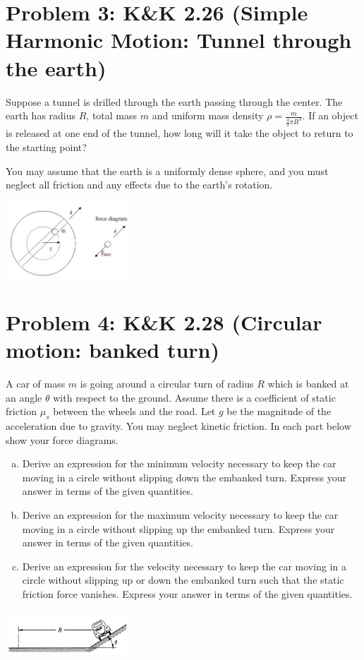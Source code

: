 \documentclass[problems]{esg8012pset}
\begin{document}
\section*{Problem 3: K\&K 2.26 (Simple Harmonic Motion: Tunnel through the earth)}
  Suppose a tunnel is drilled through the earth passing through the center. The earth has radius $R$, total mass $m$ and uniform mass density $\rho = \frac{m}{\frac{4}{3}\pi R^3}$.  If an object is released at one end of the tunnel, how long will it take the object to return to the starting point?

  You may assume that the earth is a uniformly dense sphere, and you must neglect all friction and any effects due to the earth's rotation.
  \begin{center}\includegraphics[width=0.35\textwidth]{ps03_2}\end{center}
\section*{Problem 4: K\&K 2.28 (Circular motion: banked turn)}
  A car of mass $m$ is going around a circular turn of radius $R$ which is banked at an angle $\theta$ with respect to the ground. Assume there is a coefficient of static friction $\mu_s$ between the wheels and the road. Let $g$ be the magnitude of the acceleration due to gravity. You may neglect kinetic friction. In each part below show your force diagrams.
  \begin{enumerate}[a)]
    \item Derive an expression for the minimum velocity necessary to keep the car moving in a circle without slipping down the embanked turn. Express your answer in terms of the given quantities.
    \item Derive an expression for the maximum velocity necessary to keep the car moving in a circle without slipping up the embanked turn. Express your answer in terms of the given quantities.
    \item Derive an expression for the velocity necessary to keep the car moving in a circle without slipping up or down the embanked turn such that the static friction force vanishes. Express your answer in terms of the given quantities.
  \end{enumerate}
  \begin{center}\includegraphics[width=0.35\textwidth]{ps03_3}\end{center}
\end{document}
